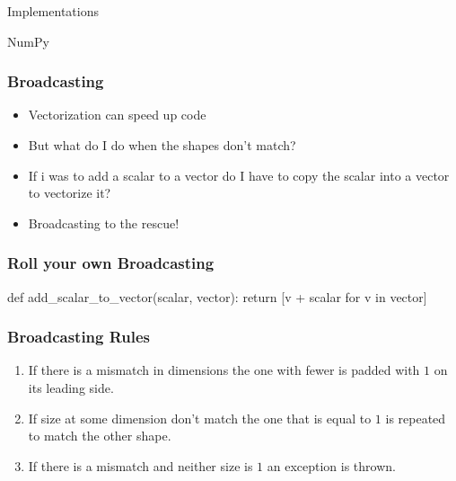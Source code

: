 \documentclass{beamer}
\theoremstyle{case}
\begin{document}
\begin{section}{Implementations}
\begin{subsection}{NumPy}
\begin{frame}
    \frametitle{Broadcasting}
    \begin{itemize}
        \item<1-> Vectorization can speed up code
        \item<2-> But what do I do when the shapes don't match?
        \item<3-> If i was to add a scalar to a vector do I have to copy the scalar into a vector to vectorize it?
        \item<4-> Broadcasting to the rescue!
    \end{itemize}
\end{frame}

\begin{frame}[fragile]
    \frametitle{Roll your own Broadcasting}
    \begin{pythoncode}
        def add_scalar_to_vector(scalar, vector):
            return [v + scalar for v in vector]
    \end{pythoncode}
\end{frame}

\begin{frame}
    \frametitle{Broadcasting Rules}
    \begin{enumerate}
        \item If there is a mismatch in dimensions the one with fewer is padded with $1$ on its leading side.
        \item If size at some dimension don't match the one that is equal to $1$ is repeated to match the other shape.
        \item If there is a mismatch and neither size is $1$ an exception is thrown.
    \end{enumerate}
\end{frame}


\end{subsection}
\end{section}
\end{document}
